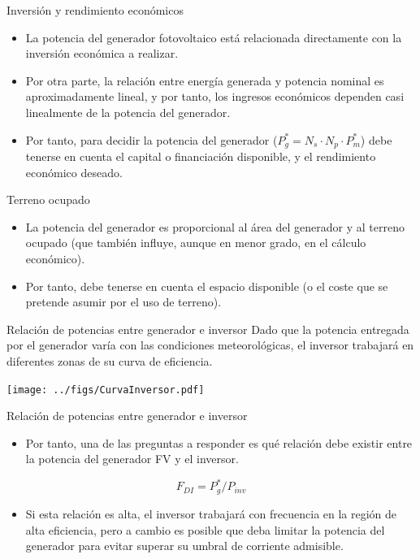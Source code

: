 \documentclass[aspectratio=169, usenames,svgnames,dvipsnames]{beamer}
\begin{document}
\begin{frame}[label={sec:org750e93d}]{Inversión y rendimiento económicos}
\begin{itemize}
\item La potencia del generador fotovoltaico está relacionada directamente
con la \alert{inversión económica} a realizar.

\item Por otra parte, la relación entre \alert{energía generada} y potencia
nominal es aproximadamente lineal, y por tanto, los \alert{ingresos
económicos} dependen casi linealmente de la potencia del generador.

\item Por tanto, para decidir la potencia del generador
(\(P_{g}^{*}=N_{s}\cdot N_{p}\cdot P_{m}^{*}\)) debe tenerse en cuenta
el capital o financiación disponible, y el rendimiento económico
deseado.
\end{itemize}
\end{frame}

\begin{frame}[label={sec:orgda628fc}]{Terreno ocupado}
\begin{itemize}
\item La potencia del generador es proporcional al área del generador y al \alert{terreno ocupado} (que también influye, aunque en menor grado, en el cálculo económico).

\item Por tanto, debe tenerse en cuenta el espacio disponible (o el coste que se pretende asumir por el uso de terreno).
\end{itemize}
\end{frame}

\begin{frame}[label={sec:orgb510c90}]{Relación de potencias entre generador e inversor}
Dado que la potencia entregada por el generador varía con las condiciones meteorológicas, el inversor trabajará en diferentes zonas de su curva de eficiencia.

\begin{center}
\texttt{[image: ../figs/CurvaInversor.pdf]}
\end{center}
\end{frame}


\begin{frame}[label={sec:org830ae96}]{Relación de potencias entre generador e inversor}
\begin{itemize}
\item Por tanto, una de las preguntas a responder es \alert{qué relación debe existir entre la potencia del generador FV y el inversor}.
\end{itemize}

\[
  F_{DI} = P_{g}^{*}/P_{inv}
\]

\begin{itemize}
\item Si esta relación es alta, el inversor trabajará con frecuencia en la región de alta eficiencia, pero a cambio es posible que deba limitar la potencia del generador para evitar superar su umbral de corriente admisible.
\end{itemize}
\end{frame}
\end{document}
